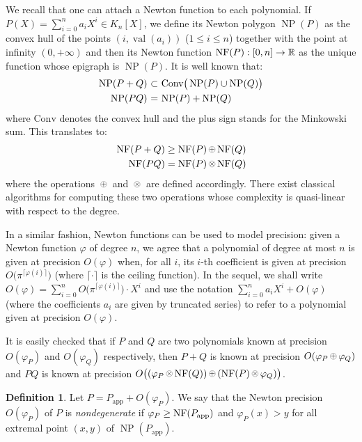 \documentclass{sig-alternate-05-2015}
\DeclareMathOperator{\NP}{NP}
\DeclareMathOperator{\val}{val}
\newcommand{\R}{\mathbb R}
\newcommand{\NF}{\text{\rm NF}}
\newcommand{\nfop}[1]{%
\raisebox{-0.1mm}{\begin{tikzpicture}
\draw[transparent] (-0.18,0)--(0.18,0);
\draw[very thin] (0,0) circle (0.11cm);
\begin{scope}
\clip (0,0) circle (0.11cm);
\node[scale=0.75] at (0,0) { $#1$ };
\end{scope}
\end{tikzpicture}}}
\newcommand{\nfplus}{\nfop+}
\newcommand{\nftimes}{\nfop\times}
\newcommand{\app}{\textrm{app}}
\theoremstyle{definition}
\newtheorem{deftn}[theo]{Definition}
\begin{document}
We recall that one can attach a Newton function to each polynomial.
If $P(X) = \sum_{i=0}^n a_i X^i \in K_n[X]$, we define its Newton
polygon $\NP(P)$ as the convex hull of the points $(i,\val(a_i))$ 
($1 \leq i \leq n$) together with the point at infinity $(0,+\infty)$
and then its Newton function $\NF(P) : [0,n] \to \R$ as the unique
function whose epigraph is $\NP(P)$. It is well known \cite[Section~1.6]{dwork-geratto-sullivan:Gfunctions} that:
$$\begin{array}{r@{\,\,}c@{\,\,}l}
\NP(P+Q) & \subset & \text{Conv}\big(\NP(P) \cup \NP(Q)\big) \smallskip \\
\NP(PQ) & = & \NP(P) + \NP(Q)
\end{array}$$
where $\text{Conv}$ denotes the convex hull and the plus sign stands 
for the Minkowski sum. This translates to:
$$\begin{array}{r@{\,\,}c@{\,\,}l}
\NF(P+Q) \geq \NF(P) \nfplus \NF(Q) \smallskip \\
\NF(PQ) = \NF(P) \nftimes \NF(Q)
\end{array}$$
where the operations $\nfplus$ and $\nftimes$ are defined accordingly.
There exist classical algorithms for computing these two operations
whose complexity is quasi-linear with respect to the degree.

In a similar fashion, Newton functions can be used to model precision: 
given a Newton function $\varphi$ of degree $n$, we agree that a polynomial 
of degree at most $n$ is given at precision $O(\varphi)$ when, for all $i$,
its $i$-th coefficient is given at precision $O\big(\pi^{\lceil \varphi(i)
\rceil}\big)$ (where $\lceil \cdot \rceil$ is the ceiling function).
In the sequel, we shall write
$O(\varphi) = \sum_{i=0}^n O\big(\pi^{\lceil \varphi(i) \rceil}\big) \cdot X^i$
and use the notation $\sum_{i=0}^n a_i X^i + O(\varphi)$ (where the
coefficients $a_i$ are given by truncated series) to refer to a 
polynomial given at precision $O(\varphi)$.

It is easily checked that if $P$ and $Q$ are two polynomials known at 
precision $O(\varphi_P)$ and $O(\varphi_Q)$ respectively, then $P+Q$ is 
known at precision $O(\varphi_P \nfplus \varphi_Q)$ and $PQ$ is known at 
precision $O\big((\varphi_P \nftimes \NF(Q)) \nfplus (\NF(P) \nftimes 
\varphi_Q)\big)$.

\begin{deftn}
\label{def:nondeg}
Let $P = P_\app + O(\varphi_P)$. We say that the Newton precision 
$O(\varphi_P)$ of $P$ is \emph{nondegenerate} if $\varphi_P \geq 
\NF(P_\app)$ and $\varphi_P(x) > y$ for all extremal point $(x,y)$ of 
$\NP(P_\app)$.
\end{deftn}
\end{document}
